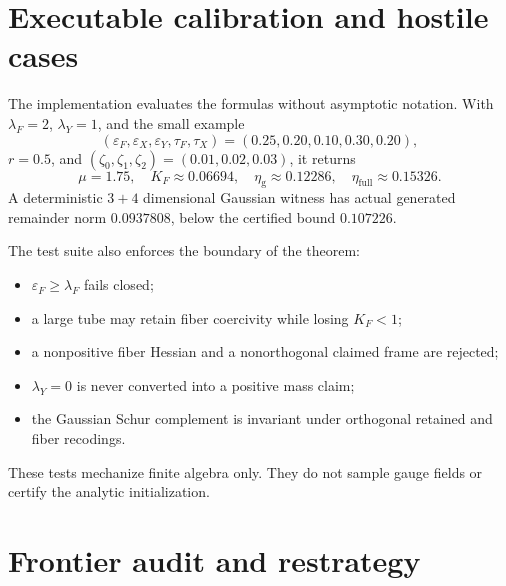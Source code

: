 \documentclass[11pt]{article}
\theoremstyle{definition}
\newcommand{\good}{\mathrm g}
\begin{document}
\section{Executable calibration and hostile cases}

The implementation evaluates the formulas without asymptotic notation.  With
$\lambda_F=2$, $\lambda_Y=1$, and the small example
\[
 (\varepsilon_F,\varepsilon_X,\varepsilon_Y,\tau_F,\tau_X)
 =(0.25,0.20,0.10,0.30,0.20),
\]
$r=0.5$, and $(\zeta_0,\zeta_1,\zeta_2)=(0.01,0.02,0.03)$, it returns
\[
 \mu=1.75,
 \quad K_F\approx0.06694,
 \quad \eta_{\good}\approx0.12286,
 \quad \eta_{\mathrm{full}}\approx0.15326.
\]
A deterministic $3+4$ dimensional Gaussian witness has actual generated
remainder norm $0.0937808$, below the certified bound $0.107226$.

The test suite also enforces the boundary of the theorem:
\begin{itemize}
\item $\varepsilon_F\ge\lambda_F$ fails closed;
\item a large tube may retain fiber coercivity while losing $K_F<1$;
\item a nonpositive fiber Hessian and a nonorthogonal claimed frame are rejected;
\item $\lambda_Y=0$ is never converted into a positive mass claim;
\item the Gaussian Schur complement is invariant under orthogonal retained and
fiber recodings.
\end{itemize}

These tests mechanize finite algebra only.  They do not sample gauge fields or
certify the analytic initialization.

\section{Frontier audit and restrategy}
\end{document}
